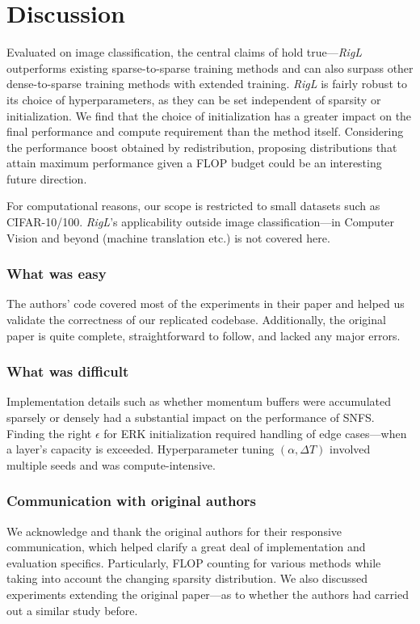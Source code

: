\section{Discussion}

Evaluated on image classification, the central claims of \citet{rigl} hold true---\textit{RigL} outperforms existing sparse-to-sparse training methods and can also surpass other dense-to-sparse training methods with extended training. \textit{RigL} is fairly robust to its choice of hyperparameters, as they can be set independent of sparsity or initialization. We find that the choice of initialization has a greater impact on the final performance and compute requirement than the method itself. Considering the performance boost obtained by redistribution, proposing distributions that attain maximum performance given a FLOP budget could be an interesting future direction.


For computational reasons, our scope is restricted to small datasets such as CIFAR-10/100. \textit{RigL}'s applicability outside image classification---in Computer Vision and beyond (machine translation etc.) is not covered here.

\subsubsection{What was easy}
The authors' code covered most of the experiments in their paper and helped us validate the correctness of our replicated codebase. Additionally, the original paper is quite complete, straightforward to follow, and lacked any major errors.

\subsubsection{What was difficult}

Implementation details such as whether momentum buffers were accumulated sparsely or densely had a substantial impact on the performance of SNFS. Finding the right $\epsilon$ for ERK initialization required handling of edge cases---when a layer's capacity is exceeded. Hyperparameter tuning $(\alpha, \Delta T)$ involved multiple seeds and was compute-intensive.

\subsubsection{Communication with original authors}

We acknowledge and thank the original authors for their responsive communication, which helped clarify a great deal of implementation and evaluation specifics. Particularly, FLOP counting for various methods while taking into account the changing sparsity distribution. We also discussed experiments extending the original paper---as to whether the authors had carried out a similar study before.